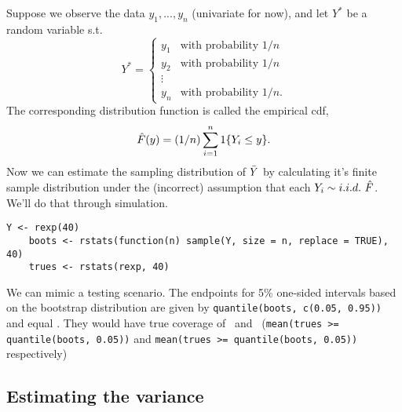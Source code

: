\begin{itemize}
  Suppose we observe the data $y_1,...,y_n$ (univariate for now), and
  let $Y^*$ be a random variable s.t.
  \begin{equation*}
    Y^* =
    \begin{cases}
      y_1 & \text{with probability } 1/n \\
      y_2 & \text{with probability } 1/n \\
      \vdots \\
      y_n & \text{with probability } 1/n.
    \end{cases}
  \end{equation*}
  The corresponding distribution function is called the empirical cdf,
  \begin{equation*}
    \hat{F}(y) = (1/n) \sum_{i=1}^n \operatorname{1}\{ Y_i \leq y \}.
  \end{equation*}
  Now we can estimate the sampling distribution of $\bar{Y}$ by
  calculating it's finite sample distribution under the (incorrect)
  assumption that each $Y_i \sim i.i.d.\ \hat{F}$.  We'll do that through
  simulation.

  \begin{lstlisting}[gobble=4]
    Y <- rexp(40)
    boots <- rstats(function(n) sample(Y, size = n, replace = TRUE), 40)
    trues <- rstats(rexp, 40)
  \end{lstlisting}

  We can mimic a testing scenario.  The endpoints for 5\% one-sided
  intervals based on the bootstrap distribution are given by
  \lstinline|quantile(boots, c(0.05, 0.95))| and equal \bootquantiles.
  They would have true coverage of \bootleft\ and \bootright\
  (\lstinline|mean(trues >= quantile(boots, 0.05))| and
  \lstinline|mean(trues >= quantile(boots, 0.05))| respectively)

\end{itemize}

\subsection{Estimating the variance}

